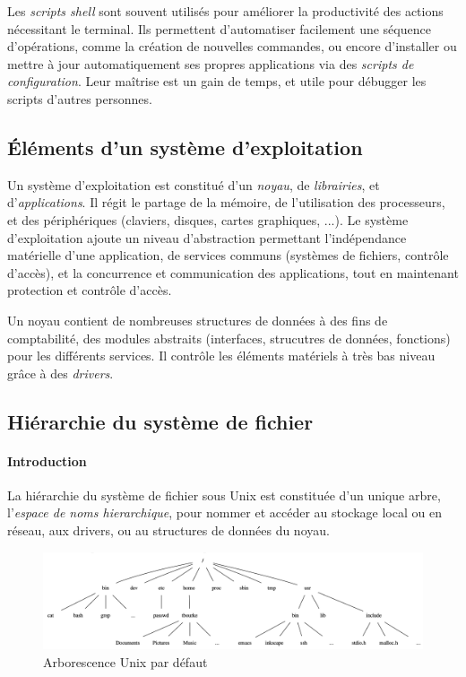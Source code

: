 \documentclass[french, toc]{../cs-classes/cs-classes}
\begin{document}
Les \emph{scripts shell} sont souvent utilisés pour améliorer la productivité des actions nécessitant le terminal. Ils permettent d'automatiser facilement une séquence d'opérations, comme la création de nouvelles commandes, ou encore d'installer ou mettre à jour automatiquement ses propres applications via des \emph{scripts de configuration}. Leur maîtrise est un gain de temps, et utile pour débugger les scripts d'autres personnes.

\subsection{Éléments d'un système d'exploitation}
Un système d'exploitation est constitué d'un \emph{noyau}, de \emph{librairies}, et d'\emph{applications}. Il régit le partage de la mémoire, de l'utilisation des processeurs, et des périphériques (claviers, disques, cartes graphiques, ...). Le système d'exploitation ajoute un niveau d'abstraction permettant l'indépendance matérielle d'une application, de services communs (systèmes de fichiers, contrôle d'accès), et la concurrence et communication des applications, tout en maintenant protection et contrôle d'accès.

Un noyau contient de nombreuses structures de données à des fins de comptabilité, des modules abstraits (interfaces, strucutres de données, fonctions) pour les différents services. Il contrôle les éléments matériels à très bas niveau grâce à des \emph{drivers}. 

\subsection{Hiérarchie du système de fichier}
\paragraph{Introduction} La hiérarchie du système de fichier sous Unix est constituée d'un unique arbre, l'\emph{espace de noms hierarchique}, pour nommer et accéder au stockage local ou en réseau, aux drivers, ou au structures de données du noyau.
\begin{figure}[!ht]
    \centering
    \includegraphics[scale=0.35]{unix-tree.png}
    \caption{Arborescence Unix par défaut}
\end{figure}
\end{document}
